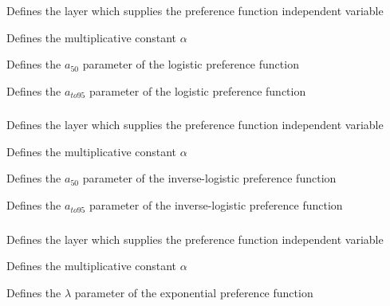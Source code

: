  {Defines the layer which supplies the preference function independent variable}

 {Defines the multiplicative constant $\alpha$}

 {Defines the $a_{50}$ parameter of the logistic preference function}

 {Defines the $a_{to95}$ parameter of the logistic preference function}

\subsubsection[Inverse-logistic]{}

 {Defines the layer which supplies the preference function independent variable}

 {Defines the multiplicative constant $\alpha$}

 {Defines the $a_{50}$ parameter of the inverse-logistic preference function}

 {Defines the $a_{to95}$ parameter of the inverse-logistic preference function}

\subsubsection[Exponential]{}

 {Defines the layer which supplies the preference function independent variable}

 {Defines the multiplicative constant $\alpha$}

 {Defines the $\lambda$ parameter of the exponential preference function}

